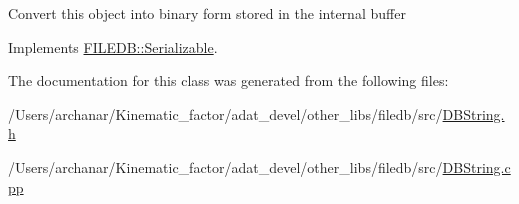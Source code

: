 Convert this object into binary form stored in the internal buffer 

Implements \mbox{\hyperlink{classFILEDB_1_1Serializable_a8deaa86e108c08c863881e46cf5578ea}{F\+I\+L\+E\+D\+B\+::\+Serializable}}.



The documentation for this class was generated from the following files\+:\begin{DoxyCompactItemize}
\item 
/\+Users/archanar/\+Kinematic\+\_\+factor/adat\+\_\+devel/other\+\_\+libs/filedb/src/\mbox{\hyperlink{other__libs_2filedb_2src_2DBString_8h}{D\+B\+String.\+h}}\item 
/\+Users/archanar/\+Kinematic\+\_\+factor/adat\+\_\+devel/other\+\_\+libs/filedb/src/\mbox{\hyperlink{DBString_8cpp}{D\+B\+String.\+cpp}}\end{DoxyCompactItemize}
